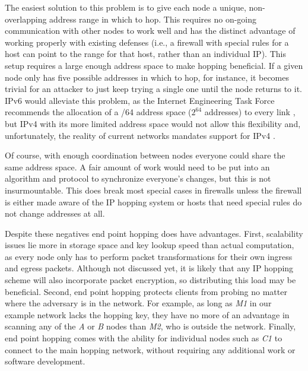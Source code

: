 \par The easiest solution to this problem is to give each node a unique, non-overlapping address range in which to hop. This requires no on-going communication with other nodes to work well and has the distinct advantage of working properly with existing defenses (i.e., a firewall with special rules for a host can point to the range for that host, rather than an individual IP). This setup requires a large enough address space to make hopping beneficial. If a given node only has five possible addresses in which to hop, for instance, it becomes trivial for an attacker to just keep trying a single one until the node returns to it. \ac{IPv6} would alleviate this problem, as the Internet Engineering Task Force recommends the allocation of a /64 address space ($2^{64}$ addresses) to every link \cite{rfc3267}, but \ac{IPv4} with its more limited address space would not allow this flexibility and, unfortunately, the reality of current networks mandates support for \ac{IPv4} \cite{EvaluatingIPv6}. 

\par Of course, with enough coordination between nodes everyone could share the same address space. A fair amount of work would need to be put into an algorithm and protocol to synchronize everyone's changes, but this is not insurmountable. This does break most special cases in firewalls unless the firewall is either made aware of the \ac{IP} hopping system or hosts that need special rules do not change addresses at all.

\par Despite these negatives end point hopping does have advantages. First, scalability issues lie more in storage space and key lookup speed than actual computation, as every node only has to perform packet transformations for their own ingress and egress packets. Although not discussed yet, it is likely that any IP hopping scheme will also incorporate packet encryption, so distributing this load may be beneficial. Second, end point hopping protects clients from probing no matter where the adversary is in the network. For example, as long as \textit{M1} in our example network lacks the hopping key, they have no more of an advantage in scanning any of the \textit{A} or \textit{B} nodes than \textit{M2}, who is outside the network. Finally, end point hopping comes with the ability for individual nodes such as \textit{C1} to connect to the main hopping network, without requiring any additional work or software development.

